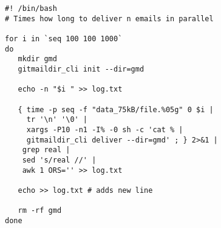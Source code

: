 \begin{verbatim}
#! /bin/bash
# Times how long to deliver n emails in parallel

for i in `seq 100 100 1000`
do
   mkdir gmd
   gitmaildir_cli init --dir=gmd

   echo -n "$i " >> log.txt

   { time -p seq -f "data_75kB/file.%05g" 0 $i |
     tr '\n' '\0' |
     xargs -P10 -n1 -I% -0 sh -c 'cat % |
     gitmaildir_cli deliver --dir=gmd' ; } 2>&1 |
    grep real |
    sed 's/real //' |
    awk 1 ORS='' >> log.txt

   echo >> log.txt # adds new line

   rm -rf gmd
done
\end{verbatim}
